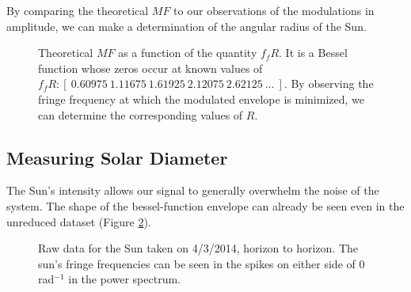 \documentclass[12pt]{article}
\begin{document}
By comparing the theoretical $MF$ to our observations of the modulations in amplitude, we can make a determination of the angular radius of the Sun.

\begin{figure}[H]
\caption[SODUMB]{Theoretical $MF$ as a function of the quantity $f_f R$. It is a Bessel function whose zeros occur at known values of $f_f R: [ \ 0.60975\  1.11675\  1.61925 \ 2.12075\  2.62125\ \ldots\ ] $. By observing the fringe frequency at which the modulated envelope is minimized, we can determine the corresponding values of $R$.}
\label{fig:MF}
\end{figure}

\subsection{Measuring Solar Diameter}
The Sun's intensity allows our signal to generally overwhelm the noise of the system. The shape of the bessel-function envelope can already be seen even in the unreduced dataset (Figure \ref{fig:sunoriginal}).

\begin{figure}[H]
\caption[SODUMB]{Raw data for the Sun taken on 4/3/2014, horizon to horizon. The sun's fringe frequencies can be seen in the spikes on either side of 0 rad$^{-1}$ in the power spectrum.}
\label{fig:sunoriginal}
\end{figure}
\end{document}
